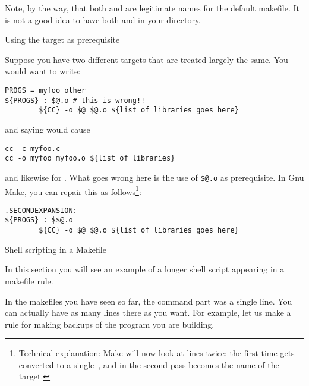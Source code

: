 Note, by the way, that both  and  are
legitimate names for the default makefile. It is not a good idea to
have both  and  in your directory.

 {Using the target as prerequisite}

Suppose you have two different targets that are treated largely the
same. You would want to write:
\begin{verbatim}
PROGS = myfoo other
${PROGS} : $@.o # this is wrong!!
        ${CC} -o $@ $@.o ${list of libraries goes here}
\end{verbatim}
and saying  would cause 
\begin{verbatim}
cc -c myfoo.c
cc -o myfoo myfoo.o ${list of libraries}
\end{verbatim}
and likewise for . What goes wrong here is the use of
\verb+$@.o+ as prerequisite. In Gnu Make, you can repair this as
follows\footnote{Technical explanation: Make will now look at lines
  twice: the first time \n{\$\$} gets converted to a single~\n{\$},
  and in the second pass  becomes the name of the target.}:
\begin{verbatim}
.SECONDEXPANSION:
${PROGS} : $$@.o
        ${CC} -o $@ $@.o ${list of libraries goes here}
\end{verbatim}


 {Shell scripting in a Makefile}

\begin{purpose}
  In this section you will see an example of a longer shell script
  appearing in a makefile rule.
\end{purpose}

In the makefiles you have seen so far, the command part was a single
line. You can actually have as many lines there as you want.
For example, let us make a rule for making backups of the program you
are building.

